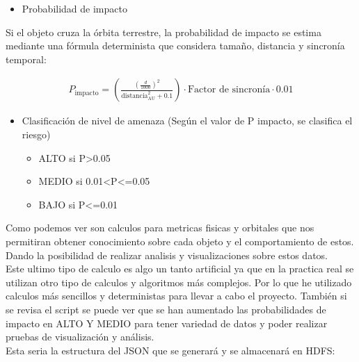 \documentclass[12pt]{article}
\begin{document}
\begin{itemize}
  \item Probabilidad de impacto
\end{itemize}

Si el objeto cruza la órbita terrestre, la probabilidad de impacto se estima mediante una fórmula determinista que considera tamaño, 
distancia y sincronía temporal:

\begin{align*}
  P_{\text{impacto}} =
  \left( \frac{\left(\frac{d}{1000}\right)^2}{\text{distancia}_{\text{AU}}^2 + 0.1} \right)
  \cdot \text{Factor de sincronía} \cdot 0.01
\end{align*}

\begin{itemize}
  \item Clasificación de nivel de amenaza (Según el valor de P impacto, se clasifica el riesgo)
  \begin{itemize}
    \item ALTO si P>0.05
    \item MEDIO si 0.01<P<=0.05
    \item BAJO si P<=0.01
  \end{itemize}
\end{itemize}

Como podemos ver son calculos para metricas fisicas y orbitales que nos permitiran obtener conocimiento sobre cada objeto y el comportamiento
de estos. Dando la posibilidad de realizar analisis y visualizaciones sobre estos datos.
\\
Este ultimo tipo de calculo es algo un tanto artificial ya que en la practica real se utilizan otro tipo de calculos
y algoritmos más complejos. Por lo que he utilizado calculos más sencillos y deterministas para llevar a cabo el proyecto.
También si se revisa el script se puede ver que se han aumentado las probabilidades de impacto en ALTO Y MEDIO para 
tener variedad de datos y poder realizar pruebas de visualización y análisis.
\\
Esta seria la estructura del JSON que se generará y se almacenará en HDFS:
\end{document}
